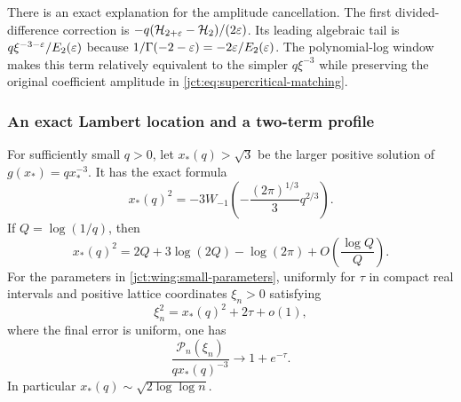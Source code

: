 There is an exact explanation for the amplitude cancellation.
The first divided-difference correction is
$-q(\mathcal{H}_{2+\varepsilon}-\mathcal{H}_2)/(2\varepsilon)$.
Its leading algebraic tail is
$q\xi^{-3-\varepsilon}/E_2(\varepsilon)$ because
$1/\Gamma(-2-\varepsilon)=-2\varepsilon/E_2(\varepsilon)$.
The polynomial-log window makes this term relatively equivalent to
the simpler $q\xi^{-3}$ while preserving the original coefficient
amplitude in \eqref{jct:eq:supercritical-matching}.

\subsubsection{An exact Lambert location and a two-term profile}

\begin{theorem}
\label{jct:thm:wing-lambert}
For sufficiently small $q>0$, let $x_*(q)>\sqrt3$ be the larger
positive solution of $g(x_*)=q x_*^{-3}$.  It has the exact formula
\begin{equation}\label{jct:wing:lambert-center}
 x_*(q)^2
 =-3W_{-1}\left(-\frac{(2\pi)^{1/3}}3q^{2/3}\right).
\end{equation}
If $Q=\log(1/q)$, then
\begin{equation}\label{jct:wing:expanded-center}
 x_*(q)^2
 =2Q+3\log(2Q)-\log(2\pi)
       +O\left(\frac{\log Q}{Q}\right).
\end{equation}
For the parameters in \eqref{jct:wing:small-parameters}, uniformly
for $\tau$ in compact real intervals and positive lattice coordinates
$\xi_n>0$ satisfying
\begin{equation}\label{jct:wing:transition-coordinate}
 \xi_n^2=x_*(q)^2+2\tau+o(1),
\end{equation}
where the final error is uniform, one has
\begin{equation}\label{jct:wing:transition-profile}
 \frac{\mathcal P_n(\xi_n)}{qx_*(q)^{-3}}
       \longrightarrow 1+e^{-\tau}.
\end{equation}
In particular $x_*(q)\sim\sqrt{2\log\log n}$.
\end{theorem}

